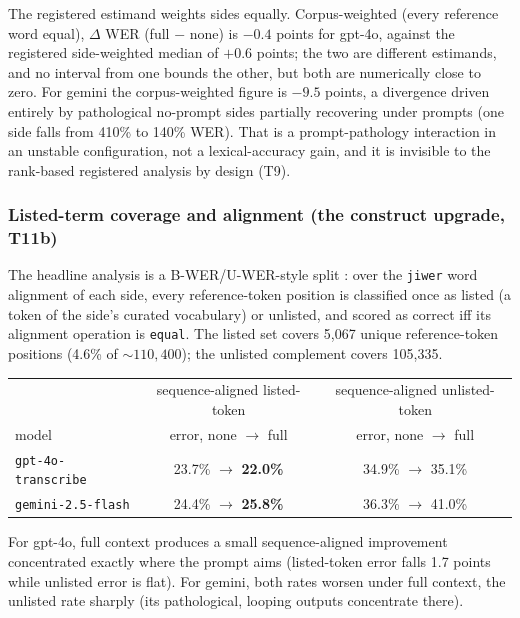 \documentclass[11pt]{article}
\begin{document}
The registered estimand weights sides equally. Corpus-weighted (every reference word equal), $\Delta$ WER (full $-$ none) is $-0.4$ points for gpt-4o, against the registered side-weighted median of $+0.6$ points; the two are different estimands, and no interval from one bounds the other, but both are numerically close to zero. For gemini the corpus-weighted figure is $-9.5$ points, a divergence driven entirely by pathological no-prompt sides partially recovering under prompts (one side falls from 410\% to 140\% WER). That is a prompt-pathology interaction in an unstable configuration, not a lexical-accuracy gain, and it is invisible to the rank-based registered analysis by design (T9).

\subsubsection*{Listed-term coverage and alignment (the construct upgrade, T11b)}

The headline analysis is a B-WER/U-WER-style split \citep{le21}: over the \texttt{jiwer} word alignment of each side, every reference-token position is classified once as listed (a token of the side's curated vocabulary) or unlisted, and scored as correct iff its alignment operation is \texttt{equal}. The listed set covers 5{,}067 unique reference-token positions (4.6\% of ${\sim}110{,}400$); the unlisted complement covers 105{,}335.

\begin{center}
\begin{tabular}{@{}lcc@{}}
\toprule
& sequence-aligned listed-token & sequence-aligned unlisted-token \\
model & error, none $\rightarrow$ full & error, none $\rightarrow$ full \\
\midrule
\texttt{gpt-4o-transcribe} & 23.7\% $\rightarrow$ \textbf{22.0\%} & 34.9\% $\rightarrow$ 35.1\% \\
\texttt{gemini-2.5-flash} & 24.4\% $\rightarrow$ \textbf{25.8\%} & 36.3\% $\rightarrow$ 41.0\% \\
\bottomrule
\end{tabular}
\end{center}

For gpt-4o, full context produces a small sequence-aligned improvement concentrated exactly where the prompt aims (listed-token error falls 1.7 points while unlisted error is flat). For gemini, both rates worsen under full context, the unlisted rate sharply (its pathological, looping outputs concentrate there).
\end{document}

